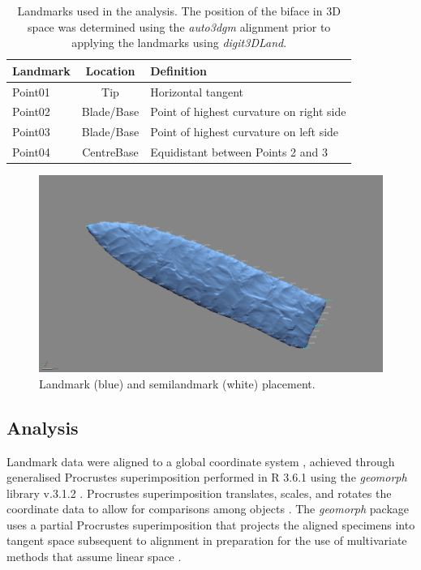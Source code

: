 \documentclass[review]{elsarticle}
\begin{document}
\begin{table}[tbh]\centering
\footnotesize
\caption{Landmarks used in the analysis. The position of the biface in 3D space was determined using the \textit{auto3dgm} alignment prior to applying the landmarks using \textit{digit3DLand}.}
\centering
\begin{tabular}{lcp{7.5cm}}
\toprule
Landmark & Location & Definition\\
\midrule
Point01 & Tip & Horizontal tangent\\
Point02 & Blade/Base & Point of highest curvature on right side\\
Point03 & Blade/Base & Point of highest curvature on left side\\
Point04 & CentreBase & Equidistant between Points 2 and 3\\
\bottomrule
\end{tabular}
\label{tab:Tbl1}
\end{table}

\begin{figure}[ht]\centering
\includegraphics[width=\linewidth]{figlm}
\caption{Landmark (blue) and semilandmark (white) placement.}
\label{fig:fig5}
\end{figure}

\subsection*{Analysis}

Landmark data were aligned to a global coordinate system \citep{RN11622,RN11623,RN11563}, achieved through generalised Procrustes superimposition \citep{RN478} performed in R 3.6.1 \citep{R} using the \textit{geomorph} library v.3.1.2 \citep{RN11530,RN1774}. Procrustes superimposition translates, scales, and rotates the coordinate data to allow for comparisons among objects \citep{RN11564,RN478}. The \textit{geomorph} package uses a partial Procrustes superimposition that projects the aligned specimens into tangent space subsequent to alignment in preparation for the use of multivariate methods that assume linear space \citep{RN1646,RN11563}.
\end{document}
